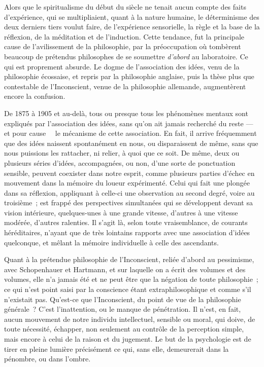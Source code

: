 \documentclass[french,twoside]{book} %
\begin{document}
Alors que le spiritualisme du début du siècle ne tenait aucun compte des faits d’expérience, qui se multipliaient, quant à la nature humaine, le déterminisme des deux derniers tiers voulut faire, de l’expérience sensorielle, la règle et la base de la réflexion, de la méditation et de l’induction. Cette tendance, fut la principale cause de l’avilissement de la philosophie, par la préoccupation où tombèrent beaucoup de prétendus philosophes de se soumettre {\itshape d’abord} au laboratoire. Ce qui est proprement absurde. Le dogme de l’association des idées, venu de la philosophie écossaise, et repris par la philosophie anglaise, puis la thèse plus que contestable de l’Inconscient, venue de la philosophie allemande, augmentèrent encore la confusion.\par
De 1875 à 1905 et au-delà, tous ou presque tous les phénomènes mentaux sont expliqués par l’association des idées, sans qu’on ait jamais recherché du reste — et pour cause   le mécanisme de cette association. En fait, il arrive fréquemment que des idées naissent spontanément en nous, ou disparaissent de même, sans que nous puissions les rattacher, ni relier, à quoi que ce soit. De même, deux ou plusieurs séries d’idées, accompagnées, ou non, d’une sorte de ponctuation sensible, peuvent coexister dans notre esprit, comme plusieurs parties d’échec en mouvement dans la mémoire du loueur expérimenté. Celui qui fait une plongée dans sa réflexion, appliquant à celle-ci une observation au second degré, voire au troisième ; est frappé des perspectives simultanées qui se développent devant sa vision intérieure, quelques-unes à une grande vitesse, d’autres à une vitesse modérée, d’autres ralenties. Il s’agit là, selon toute vraisemblance, de courants héréditaires, n’ayant que de très lointains rapports avec une association d’idées quelconque, et mêlant la mémoire individuelle à celle des ascendants.\par
Quant à la prétendue philosophie de l’Inconscient, reliée d’abord au pessimisme, avec Schopenhauer et Hartmann, et sur laquelle on a écrit des volumes et des volumes, elle n’a jamais été et ne peut être que la négation de toute philosophie ; ce qui n’est point saisi par la conscience étant extraphilosophique et comme s’il n’existait pas. Qu’est-ce que l’Inconscient, du point de vue de la philosophie générale ? C’est l’inattention, ou le manque de pénétration. Il n’est, en fait, aucun mouvement de notre individu intellectuel, sensible ou moral, qui doive, de toute nécessité, échapper, non seulement au contrôle de la perception simple, mais encore à celui de la raison et du jugement. Le but de la psychologie est de tirer en pleine lumière précisément ce qui, sans elle, demeurerait dans la pénombre, ou dans l’ombre.\par
\end{document}
